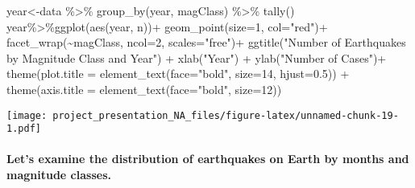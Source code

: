 \documentclass[
]{article}
\newenvironment{Shaded}{\begin{snugshade}}{\end{snugshade}}
\newcommand{\AttributeTok}[1]{\textcolor[rgb]{0.77,0.63,0.00}{#1}}
\newcommand{\DecValTok}[1]{\textcolor[rgb]{0.00,0.00,0.81}{#1}}
\newcommand{\FloatTok}[1]{\textcolor[rgb]{0.00,0.00,0.81}{#1}}
\newcommand{\FunctionTok}[1]{\textcolor[rgb]{0.00,0.00,0.00}{#1}}
\newcommand{\NormalTok}[1]{#1}
\newcommand{\OtherTok}[1]{\textcolor[rgb]{0.56,0.35,0.01}{#1}}
\newcommand{\SpecialCharTok}[1]{\textcolor[rgb]{0.00,0.00,0.00}{#1}}
\newcommand{\StringTok}[1]{\textcolor[rgb]{0.31,0.60,0.02}{#1}}
\begin{document}
\begin{Shaded}
\begin{Highlighting}[]
\NormalTok{year}\OtherTok{\textless{}{-}}\NormalTok{data }\SpecialCharTok{\%\textgreater{}\%} \FunctionTok{group\_by}\NormalTok{(year, magClass) }\SpecialCharTok{\%\textgreater{}\%} \FunctionTok{tally}\NormalTok{()}
\NormalTok{year}\SpecialCharTok{\%\textgreater{}\%}\FunctionTok{ggplot}\NormalTok{(}\FunctionTok{aes}\NormalTok{(year, n))}\SpecialCharTok{+}
\FunctionTok{geom\_point}\NormalTok{(}\AttributeTok{size=}\DecValTok{1}\NormalTok{, }\AttributeTok{col=}\StringTok{"red"}\NormalTok{)}\SpecialCharTok{+}
  \FunctionTok{facet\_wrap}\NormalTok{(}\SpecialCharTok{\textasciitilde{}}\NormalTok{magClass,  }\AttributeTok{ncol=}\DecValTok{2}\NormalTok{, }\AttributeTok{scales=}\StringTok{"free"}\NormalTok{)}\SpecialCharTok{+}
   \FunctionTok{ggtitle}\NormalTok{(}\StringTok{"Number of Earthquakes by Magnitude Class and Year"}\NormalTok{) }\SpecialCharTok{+}
           \FunctionTok{xlab}\NormalTok{(}\StringTok{"Year"}\NormalTok{) }\SpecialCharTok{+} \FunctionTok{ylab}\NormalTok{(}\StringTok{"Number of Cases"}\NormalTok{)}\SpecialCharTok{+}
  \FunctionTok{theme}\NormalTok{(}\AttributeTok{plot.title =} \FunctionTok{element\_text}\NormalTok{(}\AttributeTok{face=}\StringTok{"bold"}\NormalTok{, }\AttributeTok{size=}\DecValTok{14}\NormalTok{, }\AttributeTok{hjust=}\FloatTok{0.5}\NormalTok{)) }\SpecialCharTok{+}
\FunctionTok{theme}\NormalTok{(}\AttributeTok{axis.title =} \FunctionTok{element\_text}\NormalTok{(}\AttributeTok{face=}\StringTok{"bold"}\NormalTok{, }\AttributeTok{size=}\DecValTok{12}\NormalTok{))}
\end{Highlighting}
\end{Shaded}

\texttt{[image: project\_presentation\_NA\_files/figure-latex/unnamed-chunk-19-1.pdf]}

\hypertarget{lets-examine-the-distribution-of-earthquakes-on-earth-by-months-and-magnitude-classes.}{%
\paragraph{Let's examine the distribution of earthquakes on Earth by
months and magnitude
classes.}\label{lets-examine-the-distribution-of-earthquakes-on-earth-by-months-and-magnitude-classes.}}
\end{document}

